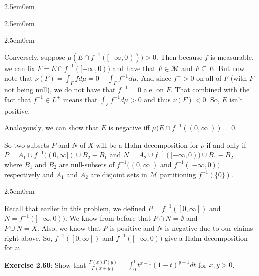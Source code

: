 \documentclass{book}
\newenvironment{myIndent}{%
   \begin{adjustwidth}{2.5em}{0em}%
}{%
   \end{adjustwidth}%
}
\newcommand{\blab}[1]{\textbf{#1}}
\newcommand{\retTwo}{\hfill\bigbreak}
\begin{document}
\begin{myIndent}
\begin{myIndent}
\begin{myIndent}
			Conversely, suppose $\mu(E \cap f^{-1}([-\infty, 0))) > 0$. Then because $f$ is measurable, we can fix $F = E \cap f^{-1}([-\infty, 0))$ and have that $F \in \mathcal{M}$ and $F \subseteq E$. But now note that $\nu(F) = \int_F fd\mu = 0 - \int_F f^{-1}d\mu$. And since $f^- > 0$ on all of $F$ (with $F$ not being null), we do not have that $f^{-1} = 0$ a.e. on $F$. That combined with the fact that $f^{-1} \in L^+$ means that $\int_F f^{-1}d\mu > 0$ and thus $\nu(F) < 0$. So, $E$ isn't positive.\retTwo
		\end{myIndent}

		Analogously, we can show that $E$ is negative iff $\mu(E \cap f^{-1}((0, \infty])) = 0$.\retTwo

		So two subsets $P$ and $N$ of $X$ will be a Hahn decomposition for $\nu$ if and only if $P = A_1 \cup f^{-1}((0, \infty]) \cup B_2 - B_1$ and $N = A_2 \cup f^{-1}([-\infty, 0))  \cup B_1 - B_2$\\ where $B_1$ and $B_2$ are null-subsets of $f^{-1}((0, \infty])$ and $f^{-1}([-\infty, 0))$\\ respectively and $A_1$ and $A_2$ are disjoint sets in $\mathcal{M}$ partitioning $f^{-1}(\{0\})$.\retTwo

		
		\begin{myIndent}
			Recall that earlier in this problem, we defined $P = f^{-1}([0, \infty])$ and $N = f^{-1}([-\infty, 0))$. We know from before that $P \cap N = \emptyset$ and\\ $P \cup N = X$. Also, we know that $P$ is positive and $N$ is negative due to our claims right above. So, $f^{-1}([0, \infty])$ and $f^{-1}([-\infty, 0))$ give a Hahn decomposition for $\nu$.\retTwo
		\end{myIndent}
	\end{myIndent}
\end{myIndent}

\blab{Exercise 2.60}: Show that $\frac{\Gamma(x)\Gamma(y)}{\Gamma(x + y)} = \int_0^1 t^{x-1}(1 - t)^{y-1}dt$ for $x, y > 0$.
\end{document}

